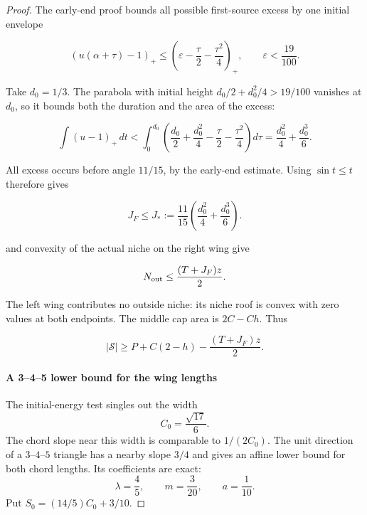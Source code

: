 \begin{proof}
The early-end proof bounds all possible first-source excess by one
initial envelope

\[
(u(\alpha+\tau)-1)_+
\le\left(\varepsilon-\frac\tau2-\frac{\tau^2}{4}\right)_+,
\qquad \varepsilon<\frac{19}{100}.
\]

Take $d_0=1/3$. The parabola with initial height
$d_0/2+d_0^2/4>19/100$ vanishes at $d_0$, so it bounds both
the duration and the area of the excess:

\[
\int(u-1)_+\,dt
<\int_0^{d_0}\left(\frac{d_0}{2}+\frac{d_0^2}{4}
                    -\frac\tau2-\frac{\tau^2}{4}\right)d\tau
=\frac{d_0^2}{4}+\frac{d_0^3}{6}.
\]

All excess occurs before angle $11/15$, by the early-end estimate.
Using $\sin t\le t$ therefore gives

\begin{equation}\label{eq:tilted-sh-6}
J_F\le J_*:=\frac{11}{15}\left(\frac{d_0^2}{4}+\frac{d_0^3}{6}\right).
\end{equation}

 and convexity of the actual niche on the right wing give

\begin{equation}\label{eq:tilted-sh-7}
N_{\rm out}\le\frac{(T+J_F)z}{2}.
\end{equation}

The left wing contributes no outside niche: its niche roof is convex
with zero values at both endpoints. The middle cap area is \(2C-Ch\).
Thus

\begin{equation}\label{eq:tilted-sh-8}
|\mathcal S|\ge P+C(2-h)-\frac{(T+J_F)z}{2}.
\end{equation}

\paragraph{A 3--4--5 lower bound for the wing lengths}

The initial-energy test singles out the width
\[
 C_0=\frac{\sqrt{17}}6.
\]
The chord slope near this width is comparable to $1/(2C_0)$.
The unit direction of a $3$--$4$--$5$ triangle has a nearby slope
$3/4$ and gives an affine lower bound for both chord lengths. Its coefficients are exact:
\begin{equation}\label{eq:tilted-sh-9}
 \lambda=\frac45,\qquad m=\frac3{20},\qquad a=\frac1{10}.
\end{equation}
Put $S_0=(14/5)C_0+3/10$.


\end{proof}
